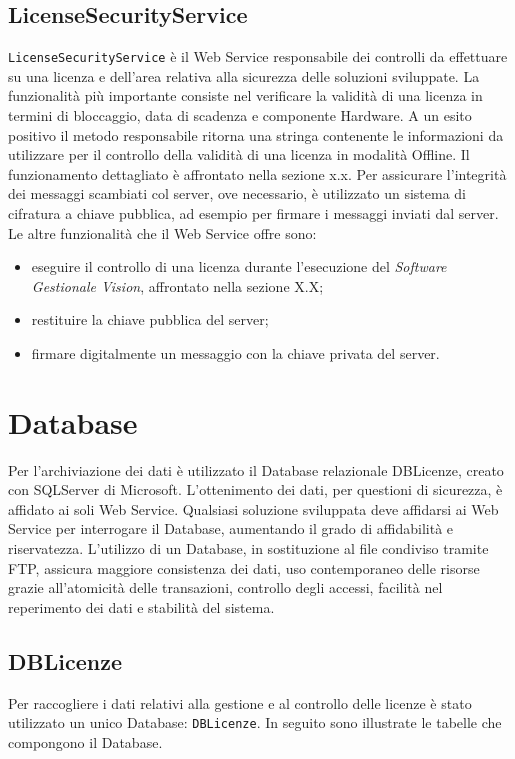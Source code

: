 \subsection{LicenseSecurityService}
\texttt{LicenseSecurityService} è il Web Service responsabile dei controlli da effettuare su una licenza e dell'area relativa alla sicurezza delle soluzioni sviluppate. La funzionalità più importante consiste nel verificare la validità di una licenza in termini di bloccaggio, data di scadenza e componente Hardware. A un esito positivo il metodo responsabile ritorna una stringa contenente le informazioni da utilizzare per il controllo della validità di una licenza in modalità Offline. Il funzionamento dettagliato è affrontato nella sezione x.x.
Per assicurare l'integrità dei messaggi scambiati col server, ove necessario, è utilizzato un sistema di cifratura a chiave pubblica, ad esempio per firmare i messaggi inviati dal server.\\
Le altre funzionalità che il Web Service offre sono:
\begin{itemize}
\item eseguire il controllo di una licenza durante l'esecuzione del \textit{Software Gestionale Vision}, affrontato nella sezione X.X;
\item restituire la chiave pubblica del server;
\item firmare digitalmente un messaggio con la chiave privata del server.

\end{itemize}


\section{Database}
\label{sez:DBLic}
Per l'archiviazione dei dati è utilizzato il Database relazionale DBLicenze, creato con SQLServer di Microsoft. L'ottenimento dei dati, per questioni di sicurezza, è affidato ai soli Web Service. Qualsiasi soluzione sviluppata deve affidarsi ai Web Service per interrogare il Database, aumentando il grado di affidabilità e riservatezza. L'utilizzo di un Database, in sostituzione al file condiviso tramite FTP, assicura maggiore consistenza dei dati, uso contemporaneo delle risorse grazie all'atomicità delle transazioni, controllo degli accessi, facilità nel reperimento dei dati e stabilità del sistema.


\subsection{DBLicenze}
Per raccogliere i dati relativi alla gestione e al controllo delle licenze è stato utilizzato un unico Database: \texttt{DBLicenze}. In seguito sono illustrate le tabelle che compongono il Database.

